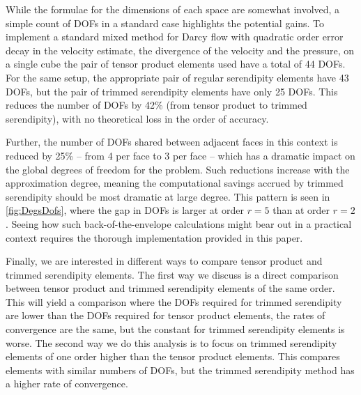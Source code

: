 \documentclass[format=acmsmall,screen,timestamp=false,a4paper]{acmart}
\newcommand\akg[1]{\textbf{\textcolor[rgb]{.5,0,1}{[Andrew: #1]}}}
\newcommand{\calS}{\mathcal{S}}
\begin{document}
   
   
   While the formulae for the dimensions of each space are somewhat involved, a simple count of DOFs in a standard case highlights the potential gains.
   To implement a standard mixed method for Darcy flow with quadratic order error decay in the velocity estimate, the divergence of the velocity and the pressure, on a single cube the pair of tensor product elements used have a total of 44 DOFs.
   For the same setup, the appropriate pair of regular serendipity elements have 43 DOFs, but the pair of trimmed serendipity elements have only 25 DOFs. 
   This reduces the number of DOFs by 42\% (from tensor product to trimmed serendipity), with no theoretical loss in the order of accuracy.
   
   Further, the number of DOFs shared between adjacent faces in this context is reduced by 25\% -- from 4 per face to 3 per face -- which has a dramatic impact on the global degrees of freedom for the problem.
   Such reductions increase with the approximation degree, meaning the computational savings accrued by trimmed serendipity should be most dramatic at large degree.  
   This pattern is seen in \cref{fig:DegsDofs}, where the gap in DOFs is larger at order $r=5$ than at order $r=2$.  
   Seeing how such back-of-the-envelope calculations might bear out in a practical context requires the thorough implementation provided in this paper.
   
  Finally, we are interested in different ways to compare tensor product and trimmed serendipity elements.  The first way we discuss is a direct comparison between tensor product and trimmed serendipity elements of the same order.  This will yield a comparison where the DOFs required for trimmed serendipity are lower than the DOFs required for tensor product elements, the rates of convergence are the same, but the constant for trimmed serendipity elements is worse.  The second way we do this analysis is to focus on trimmed serendipity elements of one order higher than the tensor product elements.  This compares elements with similar numbers of DOFs, but the trimmed serendipity method has a higher rate of convergence.

   
   
   
\end{document}
